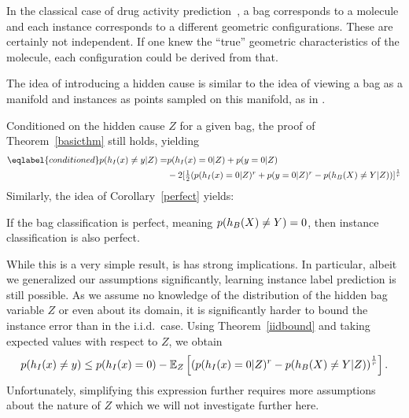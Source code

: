 In the classical case of drug activity
prediction~\citep{dietterich1997solving}, a bag corresponds to a molecule and
each instance corresponds to a different geometric configurations. These are
certainly not independent.  If one knew the ``true'' geometric characteristics
of the molecule, each configuration could be derived from that.

The idea of introducing a hidden cause is similar to the idea of viewing a bag
as a manifold and instances as points sampled on this manifold, as in
\citet{ICML2011Babenko_74}.

Conditioned on the hidden cause $Z$ for a given bag, the proof of Theorem~\ref{basicthm} still holds, yielding
\begin{align}\eqlabel{conditioned}
p(h_I(x) \neq y | Z) =&p(h_I(x)=0|Z) + p(y=0|Z)\\
&\textstyle- 2  [\frac{1}{2} ( p(h_I(x)=0|Z)^r + p(y=0|Z)^r
 - p(h_B(X) \neq Y|Z)) ]^\frac{1}{r}
\end{align}
Similarly, the idea of Corollary~\ref{perfect} yields:

\begin{corollary}\label{perfect}
If the bag classification is perfect, meaning $p(h_B(X) \neq Y)=0$, then instance classification is also perfect.
\end{corollary}

While this is a very simple result, is has strong implications. In particular, albeit we generalized our
assumptions significantly, learning instance label prediction is still possible.
As we assume no knowledge of the distribution of the hidden bag variable $Z$ or even about its domain, it is significantly harder
to bound the instance error than in the i.i.d.\ case.
Using Theorem~\ref{iidbound} and taking expected values with respect to $Z$, we obtain
\begin{equation}
    p(h_I(x)\neq y)
    \leq p(h_I(x)=0) - \mathbb{E}_Z \left [\left ( p(h_I(x)=0 | Z)^r - p(h_B(X)\neq Y|Z) \right ) ^ \frac{1}{r} \right ].
\end{equation}
Unfortunately, simplifying this expression further requires more assumptions
about the nature of $Z$ which we will not investigate further here.


